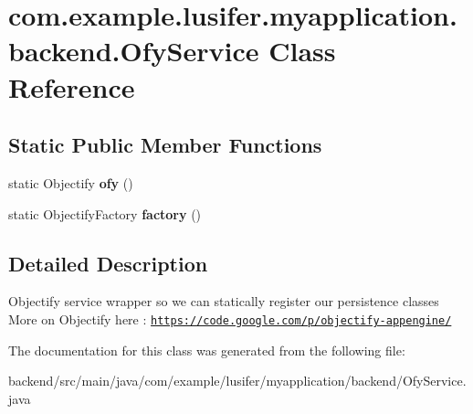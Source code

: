 \hypertarget{classcom_1_1example_1_1lusifer_1_1myapplication_1_1backend_1_1_ofy_service}{}\section{com.\+example.\+lusifer.\+myapplication.\+backend.\+Ofy\+Service Class Reference}
\label{classcom_1_1example_1_1lusifer_1_1myapplication_1_1backend_1_1_ofy_service}
\subsection*{Static Public Member Functions}
\begin{DoxyCompactItemize}
\item 
\hypertarget{classcom_1_1example_1_1lusifer_1_1myapplication_1_1backend_1_1_ofy_service_a2bf176fe6c1e01455592c82ef179960e}{}static Objectify {\bfseries ofy} ()\label{classcom_1_1example_1_1lusifer_1_1myapplication_1_1backend_1_1_ofy_service_a2bf176fe6c1e01455592c82ef179960e}

\item 
\hypertarget{classcom_1_1example_1_1lusifer_1_1myapplication_1_1backend_1_1_ofy_service_a32ff8961e2d91e2273d6f700098c53d0}{}static Objectify\+Factory {\bfseries factory} ()\label{classcom_1_1example_1_1lusifer_1_1myapplication_1_1backend_1_1_ofy_service_a32ff8961e2d91e2273d6f700098c53d0}

\end{DoxyCompactItemize}


\subsection{Detailed Description}
Objectify service wrapper so we can statically register our persistence classes More on Objectify here \+: \href{https://code.google.com/p/objectify-appengine/}{\tt https\+://code.\+google.\+com/p/objectify-\/appengine/} 

The documentation for this class was generated from the following file\+:\begin{DoxyCompactItemize}
\item 
backend/src/main/java/com/example/lusifer/myapplication/backend/Ofy\+Service.\+java\end{DoxyCompactItemize}
